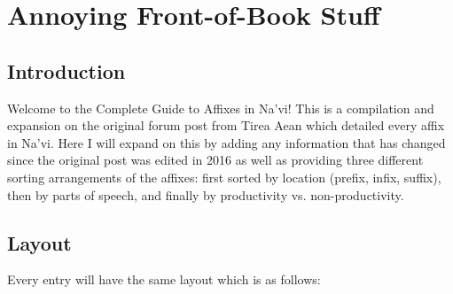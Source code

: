 \setcounter{chapter}{-1}
\chapter{Annoying Front-of-Book Stuff}
\section{Introduction}\par

Welcome to the Complete Guide to Affixes in Na'vi!  This is a compilation and expansion on the original forum post from Tirea Aean which detailed every affix in Na'vi.  Here I will expand on this by adding any information that has changed since the original post was edited in 2016 as well as providing three different sorting arrangements of the affixes: first sorted by location (prefix, infix, suffix), then by parts of speech, and finally by productivity vs. non-productivity.\par

\section{Layout}\par
Every entry will have the same layout which is as follows:

